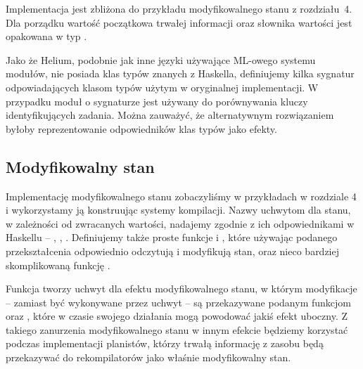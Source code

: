 

Implementacja jest zbliżona do przykładu modyfikowalnego stanu z rozdziału~4. Dla porządku wartość początkowa trwałej informacji oraz słownika wartości jest opakowana w typ .

Jako że Helium, podobnie jak inne języki używające ML-owego systemu modułów, nie posiada klas typów znanych z Haskella, definiujemy kilka sygnatur odpowiadających klasom typów użytym w oryginalnej implementacji. W przypadku  moduł o sygnaturze  jest używany do porównywania kluczy identyfikujących zadania. Można zauważyć, że alternatywnym rozwiązaniem byłoby reprezentowanie odpowiedników klas typów jako efekty.

\begin{minipage}[t]{.45\textwidth}

  

\end{minipage}\hfill
\begin{minipage}[t]{.45\textwidth}

  

\end{minipage}

\subsection{Modyfikowalny stan}

Implementację modyfikowalnego stanu zobaczyliśmy w przykładach w rozdziale 4 i wykorzystamy ją konstruując systemy kompilacji. Nazwy uchwytom dla stanu, w zależności od zwracanych wartości, nadajemy zgodnie z ich odpowiednikami w Haskellu -- , , . Definiujemy także proste funkcje  i , które używając podanego przekształcenia odpowiednio odczytują i modyfikują stan, oraz nieco bardziej skomplikowaną funkcję .



Funkcja  tworzy uchwyt dla efektu modyfikowalnego stanu, w którym modyfikacje -- zamiast być wykonywane przez uchwyt -- są przekazywane podanym funkcjom  oraz , które w czasie swojego działania mogą powodować jakiś efekt uboczny. Z takiego zanurzenia modyfikowalnego stanu w innym efekcie będziemy korzystać podczas implementacji planistów, którzy trwałą informację z zasobu będą przekazywać do rekompilatorów jako właśnie modyfikowalny stan.

